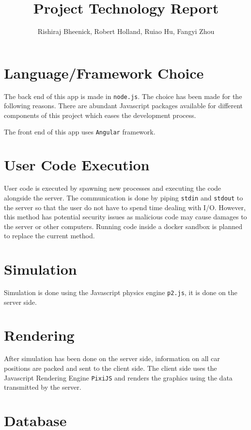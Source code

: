 \documentclass[a4paper]{article}
\title{Project Technology Report}
\author{Rishiraj Bheenick, Robert Holland, Ruiao Hu, Fangyi Zhou}
\begin{document}
\maketitle

\section{Language/Framework Choice}

The back end of this app is made in \texttt{node.js}. The choice has been made
for the following reasons. There are abundant Javascript packages available for
different components of this project which eases the development process.

The front end of this app uses \texttt{Angular} framework.

\section{User Code Execution}

User code is executed by spawning new processes and executing the code
alongside the server. The communication is done by piping \texttt{stdin} and
\texttt{stdout} to the server so that the user do not have to spend time
dealing with I/O. However, this method has potential security issues as
malicious code may cause damages to the server or other computers. Running code
inside a docker sandbox is planned to replace the current method.

\section{Simulation}

Simulation is done using the Javascript physics engine \texttt{p2.js}, it is
done on the server side.

\section{Rendering}

After simulation has been done on the server side, information on all car
positions are packed and sent to the client side. The client side uses the
Javascript Rendering Engine \texttt{PixiJS} and renders the graphics using the
data transmitted by the server.

\section{Database}
\end{document}
